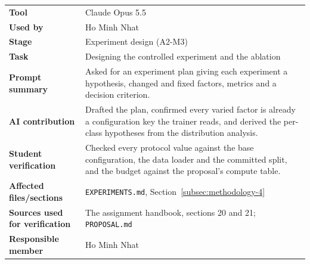 \noindent\begin{minipage}{\textwidth}
\begin{tabularx}{\textwidth}{lX}
\hline
\textbf{Tool} & Claude Opus 5.5 \\
\textbf{Used by} & Ho Minh Nhat \\
\textbf{Stage} & Experiment design (A2-M3) \\
\textbf{Task} & Designing the controlled experiment and the ablation \\
\textbf{Prompt summary} & Asked for an experiment plan giving each experiment a hypothesis, changed and fixed factors, metrics and a decision criterion. \\
\textbf{AI contribution} & Drafted the plan, confirmed every varied factor is already a configuration key the trainer reads, and derived the per-class hypotheses from the distribution analysis. \\
\textbf{Student verification} & Checked every protocol value against the base configuration, the data loader and the committed split, and the budget against the proposal's compute table. \\
\textbf{Affected files/sections} & \texttt{EXPERIMENTS.md}, Section~\ref{subsec:methodology-4} \\
\textbf{Sources used for verification} & The assignment handbook, sections 20 and 21; \texttt{PROPOSAL.md} \\
\textbf{Responsible member} & Ho Minh Nhat \\
\hline
\end{tabularx}
\end{minipage}


